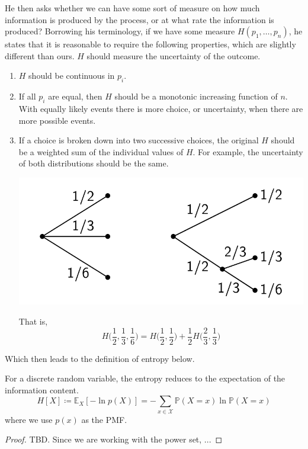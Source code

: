 \documentclass{article}
\begin{document}
    He then asks whether we can have some sort of measure on how much information is produced by the process, or at what rate the information is produced? Borrowing his terminology, if we have some measure $H(p_1, \ldots, p_n)$, he states that it is reasonable to require the following properties, which are slightly different than ours. $H$ should measure the uncertainty of the outcome. 
    \begin{enumerate}
      \item $H$ should be continuous in $p_i$.  
      \item If all $p_i$ are equal, then $H$ should be a monotonic increasing function of $n$. With equally likely events there is more choice, or uncertainty, when there are more possible events. 
      \item If a choice is broken down into two successive choices, the original $H$ should be a weighted sum of the individual values of $H$. For example, the uncertainty of both distributions should be the same. 
      \begin{center}
        \includegraphics[scale=0.6]{img/same_entropy.png}
      \end{center}
      That is, 
      \begin{equation}
        H\big( \frac{1}{2}, \frac{1}{3}, \frac{1}{6} \big) = H \big(\frac{1}{2}, \frac{1}{2} \big) + \frac{1}{2} H \big( \frac{2}{3}, \frac{1}{3} \big)
      \end{equation}
    \end{enumerate}
    Which then leads to the definition of entropy below. 

    \begin{lemma}
      For a discrete random variable, the entropy reduces to the expectation of the information content. 
      \begin{equation}
        H[X] \coloneqq \mathbb{E}_X [-\ln{p(X)}] = -\sum_{x \in \mathcal{X}} \mathbb{P}(X = x) \ln{\mathbb{P}(X = x)}
      \end{equation}
      where we use $p(x)$ as the PMF. 
    \end{lemma}
    \begin{proof}
      TBD. Since we are working with the power set, ...
    \end{proof}
\end{document}
